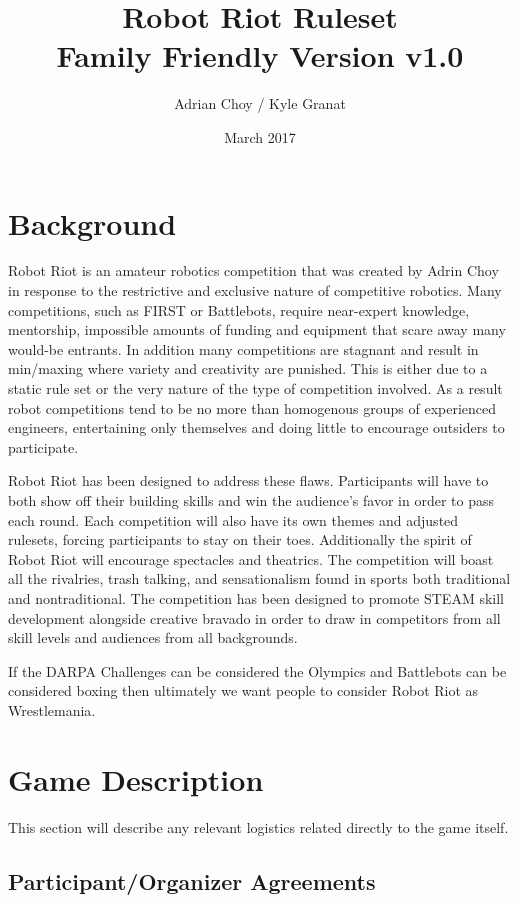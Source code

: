 \documentclass{article}
\title{Robot Riot Ruleset \\ Family Friendly Version v1.0}
\author{Adrian Choy  / Kyle Granat}
\date{March 2017}
\begin{document}
   \maketitle
   \section {Background}
   	 Robot Riot is an amateur robotics competition that was created by Adrin Choy in response to the restrictive and exclusive nature of competitive robotics. Many competitions, such as FIRST or Battlebots, require near-expert knowledge, mentorship, impossible amounts of funding and equipment that scare away many would-be entrants. In addition many competitions are stagnant and result in min/maxing where variety and creativity are punished. This is either due to a static rule set or the very nature of the type of competition involved. As a result robot competitions tend to be no more than homogenous groups of experienced engineers, entertaining only themselves and doing little to encourage outsiders to participate.
	
	Robot Riot has been designed to address these flaws. Participants will have to both show off their building skills and win the audience's favor in order to pass each round. Each competition will also have its own themes and adjusted rulesets, forcing participants to stay on their toes. Additionally the spirit of Robot Riot will encourage spectacles and theatrics. The competition will boast all the rivalries, trash talking, and sensationalism found in sports both traditional and nontraditional. The competition has been designed to promote STEAM skill development alongside creative bravado in order to draw in competitors from all skill levels and audiences from all backgrounds.
	
	If the DARPA Challenges can be considered the Olympics and Battlebots can be considered boxing then ultimately we want people to consider Robot Riot as Wrestlemania.
   
   \section {Game Description}
   	
	This section will describe any relevant logistics related directly to the game itself.
	 	
	   \subsection {Participant/Organizer Agreements}
	   	
\end{document}
